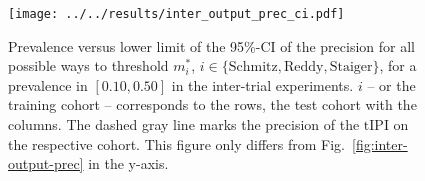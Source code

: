 \begin{figure}
    \centering
    \texttt{[image: ../../results/inter\_output\_prec\_ci.pdf]}
    \caption{Prevalence versus lower limit of the \num{95}\%-CI of the precision for all possible 
        ways to threshold $m^*_i$, $i \in \{ \text{Schmitz}, \text{Reddy}, \text{Staiger} \}$, for 
        a prevalence in $[\num{0.10}, \num{0.50}]$ in 
        the inter-trial experiments. $i$ -- or the training cohort -- corresponds to the rows, the 
        test cohort with the columns. The dashed gray 
        line marks the precision of the $\text{tIPI}$ on the respective cohort. This figure only 
        differs from Fig.\ \ref{fig:inter-output-prec} in the y-axis.}
    \label{fig:inter-output-prec-ci}
\end{figure}